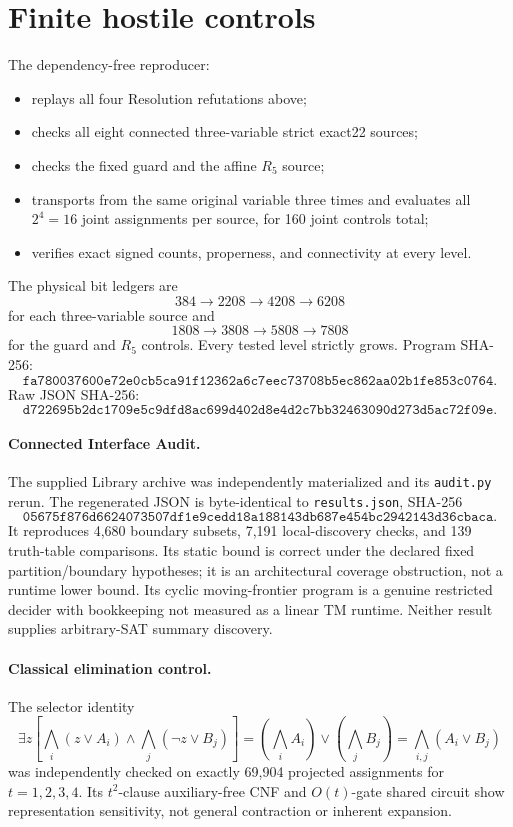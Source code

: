 \documentclass[11pt]{article}
\begin{document}
\section{Finite hostile controls}
The dependency-free reproducer:
\begin{itemize}
\item replays all four Resolution refutations above;
\item checks all eight connected three-variable strict exact22 sources;
\item checks the fixed guard and the affine \(R_5\) source;
\item transports from the same original variable three times and evaluates
all \(2^4=16\) joint assignments per source, for 160 joint controls total;
\item verifies exact signed counts, properness, and connectivity at every
level.
\end{itemize}
The physical bit ledgers are
\[
384\to2208\to4208\to6208
\]
for each three-variable source and
\[
1808\to3808\to5808\to7808
\]
for the guard and \(R_5\) controls.  Every tested level strictly grows.
Program SHA-256:
\[
\texttt{fa780037600e72e0cb5ca91f12362a6c7eec73708b5ec862aa02b1fe853c0764}.
\]
Raw JSON SHA-256:
\[
\texttt{d722695b2dc1709e5c9dfd8ac699d402d8e4d2c7bb32463090d273d5ac72f09e}.
\]

\paragraph{Connected Interface Audit.}
The supplied Library archive was independently materialized and its
\texttt{audit.py} rerun.  The regenerated JSON is byte-identical to
\texttt{results.json}, SHA-256
\[
\texttt{05675f876d6624073507df1e9cedd18a188143db687e454bc2942143d36cbaca}.
\]
It reproduces 4,680 boundary subsets, 7,191 local-discovery checks, and 139
truth-table comparisons.  Its static bound is correct under the declared
fixed partition/boundary hypotheses; it is an architectural coverage
obstruction, not a runtime lower bound.  Its cyclic moving-frontier program is
a genuine restricted decider with bookkeeping not measured as a linear TM
runtime.  Neither result supplies arbitrary-SAT summary discovery.

\paragraph{Classical elimination control.}
The selector identity
\[
\exists z\left[\bigwedge_i(z\vee A_i)\wedge
\bigwedge_j(\neg z\vee B_j)\right]
=
\left(\bigwedge_iA_i\right)\vee\left(\bigwedge_jB_j\right)
=\bigwedge_{i,j}(A_i\vee B_j)
\]
was independently checked on exactly 69,904 projected assignments for
\(t=1,2,3,4\).  Its \(t^2\)-clause auxiliary-free CNF and \(O(t)\)-gate
shared circuit show representation sensitivity, not general contraction or
inherent expansion.
\end{document}
